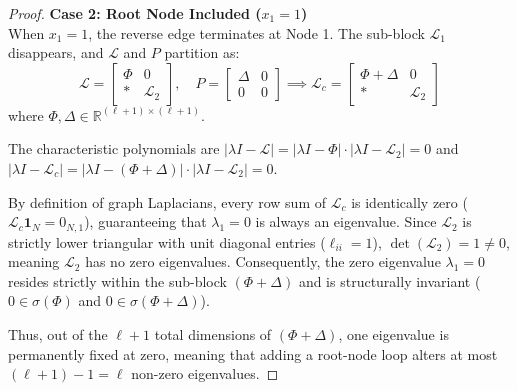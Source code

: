 \begin{proof}
\vspace{0.5em}
\textbf{Case 2: Root Node Included ($x_1 = 1$)}\\
When $x_1 = 1$, the reverse edge terminates at Node 1. The sub-block $\mathcal{L}_1$ disappears, and $\mathcal{L}$ and $P$ partition as:
\begin{equation}
	\mathcal{L} = \begin{bmatrix}
		\Phi & 0 \\
		* & \mathcal{L}_2
	\end{bmatrix}, \quad
	P = \begin{bmatrix}
		\Delta & 0 \\
		0 & 0
	\end{bmatrix} \implies
	\mathcal{L}_c = \begin{bmatrix}
		\Phi + \Delta & 0 \\
		* & \mathcal{L}_2
	\end{bmatrix}
\end{equation}
where $\Phi, \Delta \in \mathbb{R}^{(\ell+1) \times (\ell+1)}$. 

The characteristic polynomials are $|\lambda I - \mathcal{L}| = |\lambda I - \Phi| \cdot |\lambda I - \mathcal{L}_2| = 0$ and $|\lambda I - \mathcal{L}_c| = |\lambda I - (\Phi + \Delta)| \cdot |\lambda I - \mathcal{L}_2| = 0$. 

By definition of graph Laplacians, every row sum of $\mathcal{L}_c$ is identically zero ($\mathcal{L}_c \mathbf{1}_N = 0_{N, 1}$), guaranteeing that $\lambda_1 = 0$ is always an eigenvalue. Since $\mathcal{L}_2$ is strictly lower triangular with unit diagonal entries ($\ell_{ii} = 1$), $\det(\mathcal{L}_2) = 1 \neq 0$, meaning $\mathcal{L}_2$ has no zero eigenvalues. Consequently, the zero eigenvalue $\lambda_1 = 0$ resides strictly within the sub-block $(\Phi + \Delta)$ and is structurally invariant ($0 \in \sigma(\Phi)$ and $0 \in \sigma(\Phi + \Delta)$). 

Thus, out of the $\ell+1$ total dimensions of $(\Phi + \Delta)$, one eigenvalue is permanently fixed at zero, meaning that adding a root-node loop alters at most $(\ell+1) - 1 = \ell$ non-zero eigenvalues.
\end{proof}

